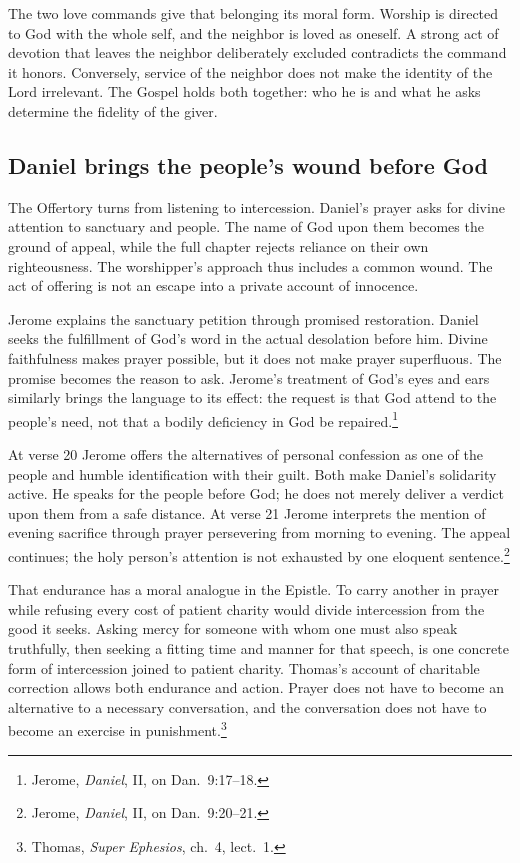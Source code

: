 The two love commands give that belonging its moral form. Worship is directed to God with the whole self, and the neighbor is loved as oneself. A strong act of devotion that leaves the neighbor deliberately excluded contradicts the command it honors. Conversely, service of the neighbor does not make the identity of the Lord irrelevant. The Gospel holds both together: who he is and what he asks determine the fidelity of the giver.

\subsection{Daniel brings the people's wound before God}
The Offertory turns from listening to intercession. Daniel's prayer asks for divine attention to sanctuary and people. The name of God upon them becomes the ground of appeal, while the full chapter rejects reliance on their own righteousness. The worshipper's approach thus includes a common wound. The act of offering is not an escape into a private account of innocence.

Jerome explains the sanctuary petition through promised restoration. Daniel seeks the fulfillment of God's word in the actual desolation before him. Divine faithfulness makes prayer possible, but it does not make prayer superfluous. The promise becomes the reason to ask. Jerome's treatment of God's eyes and ears similarly brings the language to its effect: the request is that God attend to the people's need, not that a bodily deficiency in God be repaired.\footnote{Jerome, \textit{Daniel}, II, on Dan.~9:17--18.}

At verse 20 Jerome offers the alternatives of personal confession as one of the people and humble identification with their guilt. Both make Daniel's solidarity active. He speaks for the people before God; he does not merely deliver a verdict upon them from a safe distance. At verse 21 Jerome interprets the mention of evening sacrifice through prayer persevering from morning to evening. The appeal continues; the holy person's attention is not exhausted by one eloquent sentence.\footnote{Jerome, \textit{Daniel}, II, on Dan.~9:20--21.}

That endurance has a moral analogue in the Epistle. To carry another in prayer while refusing every cost of patient charity would divide intercession from the good it seeks. Asking mercy for someone with whom one must also speak truthfully, then seeking a fitting time and manner for that speech, is one concrete form of intercession joined to patient charity. Thomas's account of charitable correction allows both endurance and action. Prayer does not have to become an alternative to a necessary conversation, and the conversation does not have to become an exercise in punishment.\footnote{Thomas, \textit{Super Ephesios}, ch.~4, lect.~1.}

